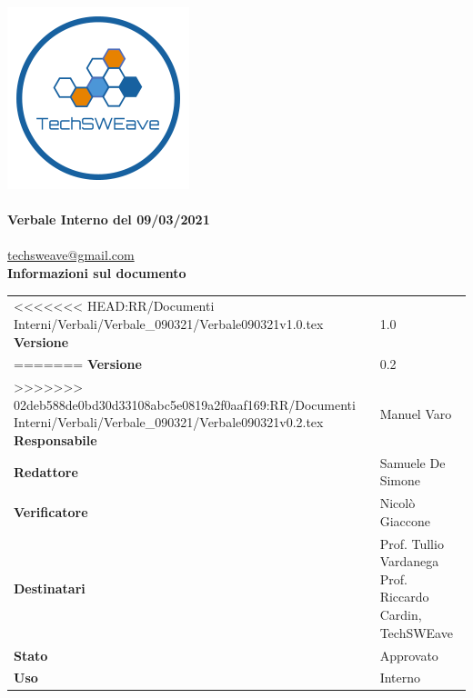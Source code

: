 \documentclass{article}
\begin{document}
\begin{titlepage}
    \begin{center}
        \includegraphics{../../../../Images/logo}\\
        \vspace{20px}
        \textcolor{logo}{\hrulefill}\\
        \vspace{20px}
        \textbf{\huge\textcolor{logo}{Verbale Interno del 09/03/2021}}\\
        \vspace{10px}
        \textcolor{logo}{\hrulefill}\\
        \vspace{20px}
        \href{mailto:techsweave@gmail.com}{techsweave@gmail.com}\\
        \vspace{40px}
        \textbf{Informazioni sul documento}\\
        \vspace{20px}
        \begin{tabular}{p{100px} | p{100px}}
<<<<<<< HEAD:RR/Documenti Interni/Verbali/Verbale_090321/Verbale090321v1.0.tex
            \textbf{Versione} & 1.0\\
=======
            \textbf{Versione} & 0.2\\
>>>>>>> 02deb588de0bd30d33108abc5e0819a2f0aaf169:RR/Documenti Interni/Verbali/Verbale_090321/Verbale090321v0.2.tex
            \textbf{Responsabile} & Manuel Varo\\
            \textbf{Redattore} & Samuele De Simone\\
            \textbf{Verificatore} & Nicolò Giaccone\\
            \textbf{Destinatari} & Prof. Tullio Vardanega \newline Prof. Riccardo Cardin, \newline TechSWEave\\
            \textbf{Stato} & Approvato\\
            \textbf{Uso} & Interno\\
        \end{tabular}
            \vspace{1ex}

    \end{center}
    \end{titlepage}
    \tableofcontents
\end{document}
